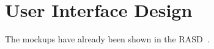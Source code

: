 \section{User Interface Design} \label{sec user interface design}

The mockups have already been shown in the RASD~\cite{rasd}.